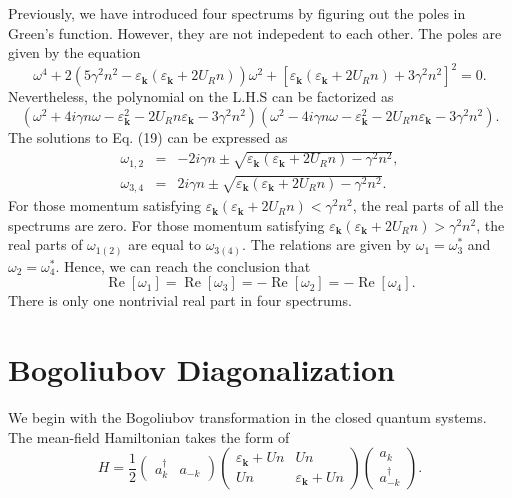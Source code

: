 \documentclass[aps,onecolumn,superscriptaddress,notitlepage,longbibliography]{revtex4-1}
\newcommand{\tmmathbf}[1]{\ensuremath{\boldsymbol{#1}}}
\newcommand{\tmop}[1]{\ensuremath{\operatorname{#1}}}
\begin{document}
Previously, we have introduced four spectrums by figuring out the poles in
Green's function. However, they are not indepedent to each other. The poles
are given by the equation
\begin{equation}
  \omega^4 + 2 (5 \gamma^2 n^2 - \varepsilon_{\tmmathbf{k}}
  (\varepsilon_{\tmmathbf{k}} + 2 U_R n)) \omega^2 +
  [\varepsilon_{\tmmathbf{k}} (\varepsilon_{\tmmathbf{k}} + 2 U_R n) + 3
  \gamma^2 n^2]^2 = 0.
\end{equation}
Nevertheless, the polynomial on the L.H.S can be factorized as
\begin{equation}
  (\omega^2 + 4 i \gamma n \omega - \varepsilon_{\tmmathbf{k}}^2 - 2 U_R n
  \varepsilon_{\tmmathbf{k}} - 3 \gamma^2 n^2) (\omega^2 - 4 i \gamma n \omega
  - \varepsilon_{\tmmathbf{k}}^2 - 2 U_R n \varepsilon_{\tmmathbf{k}} - 3
  \gamma^2 n^2) . \label{eq:poles}
\end{equation}
The solutions to Eq. (19) can be expressed as
\begin{eqnarray}
  \omega_{1, 2} & = & - 2 i \gamma n \pm \sqrt{\varepsilon_{\tmmathbf{k}}
  (\varepsilon_{\tmmathbf{k}} + 2 U_R n) - \gamma^2 n^2}, \\
  \omega_{3, 4} & = & 2 i \gamma n \pm \sqrt{\varepsilon_{\tmmathbf{k}}
  (\varepsilon_{\tmmathbf{k}} + 2 U_R n) - \gamma^2 n^2} . 
\end{eqnarray}
For those momentum satisfying $\varepsilon_{\tmmathbf{k}}
(\varepsilon_{\tmmathbf{k}} + 2 U_R n) < \gamma^2 n^2$, the real parts of all
the spectrums are zero. For those momentum satisfying
$\varepsilon_{\tmmathbf{k}} (\varepsilon_{\tmmathbf{k}} + 2 U_R n) > \gamma^2
n^2$, the real parts of $\omega_{1 (2)}$ are equal to $\omega_{3 (4)}$. The
relations are given by $\omega_1 = \omega_3^{\ast}$ and $\omega_2 =
\omega_4^{\ast}$. Hence, we can reach the conclusion that
\begin{equation}
  \tmop{Re} [\omega_1] = \tmop{Re} [\omega_3] = - \tmop{Re} [\omega_2] = -
  \tmop{Re} [\omega_4] .
\end{equation}
There is only one nontrivial real part in four spectrums.

\section{Bogoliubov Diagonalization}

We begin with the Bogoliubov transformation in the closed quantum systems. The
mean-field Hamiltonian takes the form of
\begin{equation}
  H = \frac{1}{2} \left(\begin{array}{cc}
    a_k^{\dagger} & a_{- k}
  \end{array}\right) \left(\begin{array}{cc}
    \varepsilon_{\tmmathbf{k}} + U n & U n\\
    U n & \varepsilon_{\tmmathbf{k}} + U n
  \end{array}\right) \left(\begin{array}{c}
    a_k\\
    a_{- k}^{\dagger}
  \end{array}\right) .
\end{equation}
\end{document}
